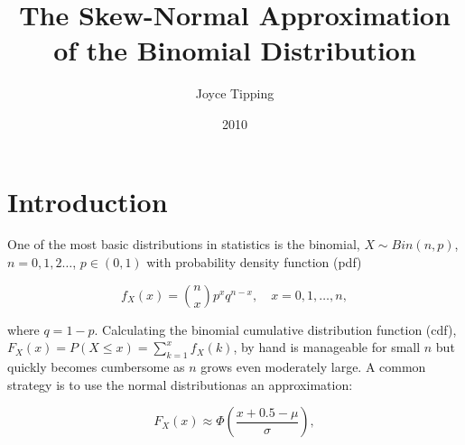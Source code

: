 \documentclass{article}
\begin{document}
\title{The Skew-Normal Approximation of the Binomial Distribution}
\author{Joyce Tipping}
\date{2010}
\maketitle

\section{Introduction}

One of the most basic distributions in statistics is the binomial, $X \sim
Bin(n,p)$, $n = 0, 1, 2 \ldots$, $p \in (0, 1)$ with probability density
function (pdf)

\begin{equation*}
  f_X(x) = \binom{n}{x} p^x q^{n-x}, \quad x = 0, 1, \ldots, n,
\end{equation*}

where $q=1-p$. Calculating the binomial cumulative distribution function (cdf),
$F_X(x) = P(X \leq x) = \sum_{k=1}^x f_X(k)$, by hand is manageable for small
$n$ but quickly becomes cumbersome as $n$ grows even moderately large. A common
strategy is to use the normal distribution\footnotemark as an approximation:


\begin{equation}
  F_X(x) \approx \Phi \left( \frac{x + 0.5 - \mu}{\sigma} \right),
\end{equation}
\end{document}
